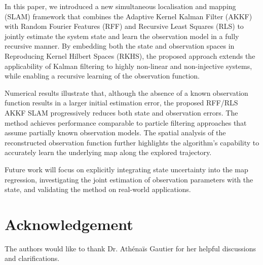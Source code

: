 \documentclass[conference]{IEEEtran}
\begin{document}
In this paper, we introduced a new simultaneous localisation and mapping (SLAM) framework that combines the Adaptive Kernel Kalman Filter (AKKF) with Random Fourier Features (RFF) and Recursive Least Squares (RLS) to jointly estimate the system state and learn the observation model in a fully recursive manner. By embedding both the state and observation spaces in Reproducing Kernel Hilbert Spaces (RKHS), the proposed approach extends the applicability of Kalman filtering to highly non-linear and non-injective systems, while enabling a recursive learning of the observation function.

Numerical results illustrate that, although the absence of a known observation function results in a larger initial estimation error, the proposed RFF/RLS AKKF SLAM progressively reduces both state and observation errors. The method achieves performance comparable to particle filtering approaches that assume partially known observation models. The spatial analysis of the reconstructed observation function further highlights the algorithm’s capability to accurately learn the underlying map along the explored trajectory.

Future work will focus on explicitly integrating state uncertainty into the map regression, investigating the joint estimation of observation parameters with the state, and validating the method on real-world applications.

\section*{Acknowledgement}

The authors would like to thank Dr. Athénaïs Gautier for her helpful discussions and clarifications.

\printbibliography
\end{document}

